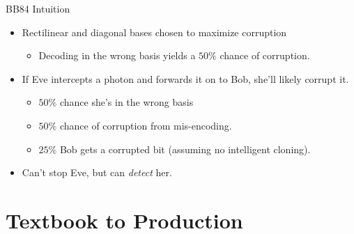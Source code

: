 \documentclass[pdf]{beamer}
\begin{document}
\begin{frame}{BB84 Intuition}
  \begin{itemize}
  \item Rectilinear and diagonal bases chosen to maximize corruption
    \begin{itemize}
    \item Decoding in the wrong basis yields a $50\%$ chance of corruption.
    \end{itemize}
  \pause\item If Eve intercepts a photon and forwards it on to Bob, she'll likely
    corrupt it.
    \begin{itemize}
    \item $50\%$ chance she's in the wrong basis
    \item $50\%$ chance of corruption from mis-encoding.
    \item $25\%$ Bob gets a corrupted bit (assuming no intelligent cloning).
    \end{itemize}
  \pause\item Can't stop Eve, but can \emph{detect} her.
  \end{itemize}
\end{frame}

\section{Textbook to Production}
\end{document}
